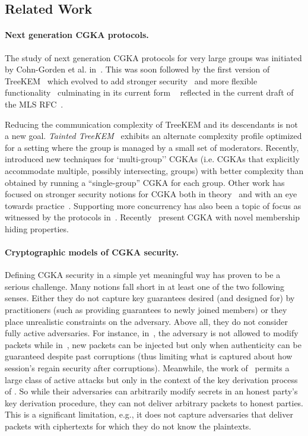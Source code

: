 \subsection{Related Work}

\paragraph{Next generation CGKA protocols.}
The study of next generation CGKA protocols for very large groups was
initiated by Cohn-Gorden et al. in~\cite{CCS:CCGMM18}. This was soon followed
by the first version of TreeKEM~\cite{TreeKEM-original-email} which
evolved to add stronger
security~\cite{TreeKEM-original-email,TreeKEM-with-blanking-email,TreeKEM-tree-signing-email}
and more flexible functionality~\cite{TreeKEM-prop-and-comm-email}
culminating in its current form \protITK{}~\cite{EPRINT:AlwJosMul20}
reflected in the current draft of the MLS RFC~\cite{mls-protocol-latest}.

Reducing the communication complexity of TreeKEM and its descendants is not a
new goal. \emph{Tainted TreeKEM}~\cite{SP:ACC+21} exhibits an alternate
complexity profile optimized for a setting where the group is managed by a
small set of moderators. Recently,~\cite{TCC:AABNKPPW21} introduced new
techniques for `multi-group'' CGKAs (i.e. CGKAs that explicitly accommodate
multiple, possibly intersecting, groups) with better complexity than obtained
by running a ``single-group'' CGKA for each group. Other work has focused on
stronger security notions for CGKA both in theory~\cite{TCC:ACJM20} and with
an eye towards practice~\cite{C:ACDT20,EPRINT:AlwJosMul20}. Supporting more
concurrency has also been a topic of focus as witnessed by the protocols
in~\cite{Eprint:BDR20,TreeKEM-prop-and-comm-email,Wei19}.
Recently~\cite{EPRINT:EKNOO22} present CGKA with novel membership hiding
properties.

\paragraph{Cryptographic models of CGKA security.}
Defining CGKA security in a simple yet meaningful way has proven to be a
serious challenge. Many notions fall short in at least one of the two
following senses. Either they do not capture key guarantees desired (and
designed for) by practitioners (such as providing guarantees to newly joined
members) or they place unrealistic constraints on the adversary. Above all,
they do not consider fully active adversaries. For instance,
in~\cite{SP:ACC+21}, the adversary is not allowed to modify packets while
in~\cite{C:ACDT20,CCS:ACDT21}, new packets can be injected but only when
authenticity can be guaranteed despite past corruptions (thus limiting what
is captured about how session's regain security after corruptions).
Meanwhile, the work of~\cite{Eprint:BCK21} permits a large class of active
attacks but only in the context of the key derivation process of \protITK{}.
So while their adversaries can arbitrarily modify secrets in an honest
party's key derivation procedure, they can not deliver arbitrary packets to
honest parties. This is a significant limitation, e.g., it does not capture
adversaries that deliver packets with ciphertexts for which they do not know
the plaintexts.


